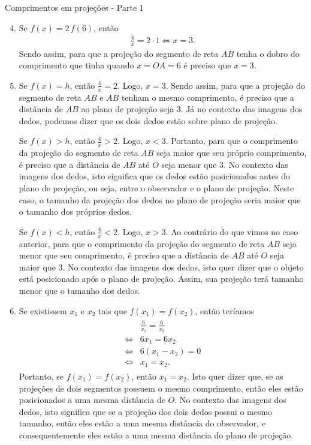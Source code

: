 \begin{answer}{Comprimentos em projeções - Parte 1}
{
\begin{enumerate}\setcounter{enumi}{3}
\item {} 
Se \(f(x) = 2 \, f(6)\), então
\begin{equation*}
\begin{split}\frac6x = 2 \cdot 1 \Longleftrightarrow x = 3.\end{split}
\end{equation*}
Sendo assim, para que a projeção do segmento de reta \(AB\) tenha o dobro do comprimento que tinha quando \(x = OA = 6\) é preciso que \(x = 3\).

\item {} 
Se \(f(x)=h\), então \(\frac6x=2\). Logo, \(x=3\). Sendo assim, para que a projeção do segmento de reta \(AB\) e \(AB\) tenham o mesmo comprimento, é preciso que a distância de \(AB\) ao plano de projeção seja \(3\). Já no contexto das imagens dos dedos, podemos dizer que os dois dedos estão sobre plano de projeção.

Se \(f(x)>h\), então \(\frac6x>2\). Logo, \(x<3\). Portanto, para que o comprimento da projeção do segmento de reta \(AB\) seja maior que seu próprio comprimento, é preciso que a distância de \(AB\) até \(O\) seja menor que \(3\). No contexto das imagens dos dedos, isto significa que os dedos estão posicionados antes do plano de projeção, ou seja, entre o observador e o plano de projeção. Neste caso, o tamanho da projeção dos dedos no plano de projeção seria maior que o tamanho dos próprios dedos.

Se \(f(x)<h\), então \(\frac6x<2\). Logo, \(x>3\). Ao contrário do que vimos no caso anterior, para que o comprimento da projeção do segmento de reta \(AB\) seja menor que seu comprimento, é preciso que a distância de \(AB\) até \(O\) seja maior que \(3\). No contexto das imagens dos dedos, isto quer dizer que o objeto está posicionado após o plano de projeção. Assim, sua projeção terá tamanho menor que o tamanho dos dedos.

\item {} 
Se existissem \(x_1\) e \(x_2\) tais que \(f(x_1)=f(x_2)\), então teríamos
\begin{equation*}
\begin{split}\begin{array}{ll}
& \frac{6}{x_1} = \frac{6}{x_2} \\
\Longleftrightarrow & 6x_1 = 6x_2 \\
\Longleftrightarrow & 6(x_1 - x_2)=0 \\
\Longleftrightarrow & x_1 = x_2.
\end{array}\end{split}
\end{equation*}
Portanto, se \(f(x_1)=f(x_2)\), então \(x_1 = x_2\). Isto quer dizer que, se as projeções de dois segmentos possuem o mesmo comprimento, então eles estão posicionados a uma mesma distância de \(O\). No contexto das imagens dos dedos, isto significa que se a projeção dos dois dedos possui o mesmo tamanho, então eles estão a uma mesma distância do observador, e consequentemente eles estão a uma mesma distância do plano de projeção.


\end{enumerate}}
\end{answer}
